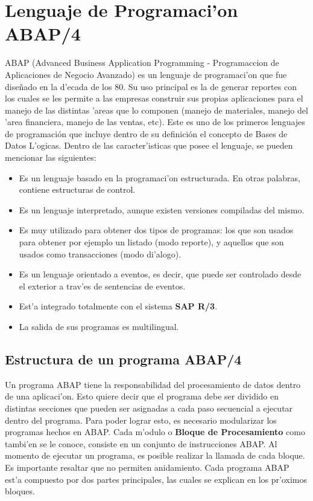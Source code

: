 \section{Lenguaje de Programaci'on ABAP/4}
ABAP (Advanced Business Application Programming - Programaccion de Aplicaciones de Negocio Avanzado) es un lenguaje de programaci'on que fue dise\~nado en la d'ecada de los 80. Su uso principal es la de generar reportes con los cuales se les permite a las empresas construir sus propias aplicaciones para el manejo de las distintas 'areas que lo componen (manejo de materiales, manejo del 'area financiera, manejo de las ventas, etc).
Este es uno de los primeros lenguajes de programación que incluye dentro de su definición el concepto de Bases de Datos L'ogicas. 
Dentro de las caracter'isticas que posee el lenguaje, se pueden mencionar las siguientes:
\begin{itemize}
\item Es un lenguaje basado en la programaci'on estructurada. En otras palabras, contiene estructuras de control.
\item Es un lenguaje interpretado, aunque existen versiones compiladas del mismo.
\item Es muy utilizado para obtener dos tipos de programas: los que son usados para obtener por ejemplo un listado (modo reporte), y aquellos que son usados como transacciones (modo di'alogo).
\item Es un lenguaje orientado a eventos, es decir, que puede ser controlado desde el exterior a trav'es de sentencias de eventos.
\item Est'a integrado totalmente con el sistema \textbf{SAP R/3}.
\item La salida de sus programas es multilingual. 
\end{itemize}

\subsection{Estructura de un programa ABAP/4}
	Un programa ABAP tiene la responsabilidad del procesamiento de datos dentro de una aplicaci'on. Esto quiere decir que el programa debe ser dividido en distintas secciones que pueden ser asignadas a cada paso secuencial a ejecutar dentro del programa. Para poder lograr esto, es necesario modularizar los programas hechos en ABAP. Cada m'odulo o \textbf{Bloque de Procesamiento} como tambi'en se le conoce, consiste en un conjunto de instrucciones ABAP. Al momento de ejecutar un programa, es posible realizar la llamada de cada bloque. Es importante resaltar que no permiten anidamiento.
	Cada programa ABAP est'a compuesto por dos partes principales, las cuales se explican en los pr'oximos bloques.

